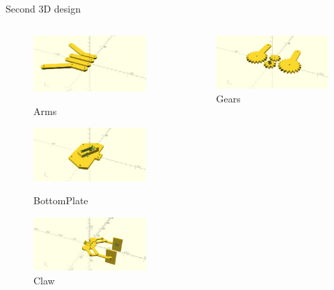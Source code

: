 \documentclass[10pt,a4paper]{beamer}
\begin{document}
\begin{frame}{Second 3D design}
\begin{columns}
\column{0.3\framewidth}
\begin{figure}
\includegraphics[scale=0.1]{Arms.png}\caption{\small{Arms}}
\includegraphics[scale=0.1]{BottomPlate.png}\caption{\small{BottomPlate}}
\includegraphics[scale=0.1]{Claw.png}\caption{\small{Claw}}
\end{figure}
\column{0.3\framewidth}
\begin{figure}
\includegraphics[scale=0.1]{Gears.png}\caption{\small{Gears}}

\end{figure}
\end{columns}
\end{frame}
\end{document}
